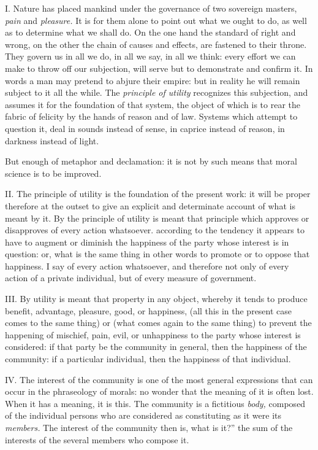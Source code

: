 \documentclass[12pt]{report}
\begin{document}
I. Nature has placed mankind under the governance of two sovereign
masters, \emph{pain} and \emph{pleasure.} It is for them alone to point
out what we ought to do, as well as to determine what we shall do. On
the one hand the standard of right and wrong, on the other the chain of
causes and effects, are fastened to their throne. They govern us in all
we do, in all we say, in all we think: every effort we can make to throw
off our subjection, will serve but to demonstrate and confirm it. In
words a man may pretend to abjure their empire: but in reality he will
remain subject to it all the while. The \emph{principle of utility}
recognizes this subjection, and assumes it for the foundation of that
system, the object of which is to rear the fabric of felicity by the
hands of reason and of law. Systems which attempt to question it, deal
in sounds instead of sense, in caprice instead of reason, in darkness
instead of light.

But enough of metaphor and declamation: it is not by such means that
moral science is to be improved.

II. The principle of utility is the foundation of the present work: it
will be proper therefore at the outset to give an explicit and
determinate account of what is meant by it. By the principle of utility
is meant that principle which approves or disapproves of every action
whatsoever. according to the tendency it appears to have to augment or
diminish the happiness of the party whose interest is in question: or,
what is the same thing in other words to promote or to oppose that
happiness. I say of every action whatsoever, and therefore not only of
every action of a private individual, but of every measure of
government.

III. By utility is meant that property in any object, whereby it tends
to produce benefit, advantage, pleasure, good, or happiness, (all this
in the present case comes to the same thing) or (what comes again to the
same thing) to prevent the happening of mischief, pain, evil, or
unhappiness to the party whose interest is considered: if that party be
the community in general, then the happiness of the community: if a
particular individual, then the happiness of that individual.

IV. The interest of the community is one of the most general expressions
that can occur in the phraseology of morals: no wonder that the meaning
of it is often lost. When it has a meaning, it is this. The community is
a fictitious \emph{body,} composed of the individual persons who are
considered as constituting as it were its \emph{members.} The interest
of the community then is, what is it?'' the sum of the interests
of the several members who compose it.
\end{document}
